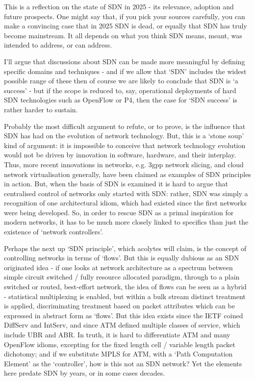 This is a reflection on the state of SDN in 2025 - its relevance, adoption and future prospects.
One might say that, if you pick your sources carefully, you can make a convincing case that in 2025 SDN is dead, or equally that SDN has truly become mainstream. It all depends on what you think SDN means, meant, was intended to address, or can address.

I’ll argue that discussions about SDN can be made more meaningful by defining specific domains and techniques - and if we allow that ‘SDN’ includes the widest possible range of these then of course we are likely to conclude that SDN is ‘a success’ - but if the scope is reduced to, say, operational deployments of hard SDN technologies such as OpenFlow or P4, then the case for ‘SDN success’ is rather harder to sustain.

Probably the most difficult argument to refute, or to prove, is the influence that SDN has had on the evolution of network technology.
But, this is a ‘stone soup’ kind of argument: it is impossible to conceive that network technology evolution would not be driven by innovation in software, hardware, and their interplay.
Thus, more recent innovations in networks, e.g. 3gpp network slicing, and cloud network virtualisation generally, have been claimed as examples of SDN principles in action.
But, when the basis of SDN is examined it is hard to argue that centralised control of networks only started with SDN: rather, SDN was simply a recognition of one architectural idiom, which had existed since the first networks were being developed.
So, in order to rescue SDN as a primal inspiration for modern networks, it has to be much more closely linked to specifics than just the existence of ‘network controllers’.

Perhaps the next up ‘SDN principle’, which acolytes will claim, is the concept of controlling networks in terms of ‘flows’.
But this is equally dubious as an SDN originated idea - if one looks at network architecture as a spectrum between simple circuit switched / fully resource allocated paradigm, through to a plain switched or routed, best-effort network, the idea of flows can be seen as a hybrid - statistical multiplexing is enabled, but within a bulk stream distinct treatment is applied, discriminating treatment based on packet attributes which can be expressed in abstract form as ‘flows’.
But this idea exists since the IETF coined DiffServ and IntServ, and since ATM defined multiple classes of service, which include UBR and ABR.
In truth, it is hard to differentiate ATM and many OpenFlow idioms, excepting for the fixed length cell / variable length packet dichotomy; and if we substitute MPLS for ATM, with a ‘Path Computation Element’ as the ‘controller’, how is this not an SDN network?
Yet the elements here predate SDN by years, or in some cases decades.
